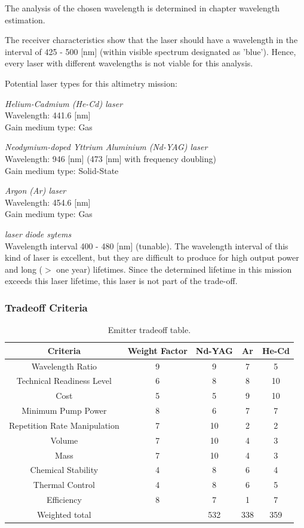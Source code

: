 The analysis of the chosen wavelength is determined in chapter wavelength estimation.

The receiver characteristics show that the laser should have a wavelength in the interval of 425 - 500 [nm] (within visible spectrum designated as 'blue'). Hence, every \acs{laser} with different wavelengths is not viable for this analysis.

Potential \acs{laser} types for this altimetry mission:

\textit{Helium-Cadmium (He-Cd) \acs{laser}}\\
Wavelength: 441.6 [nm]\\
Gain medium type: Gas

\textit{Neodymium-doped Yttrium Aluminium (Nd-YAG) \acs{laser}}\\
Wavelength: 946 [nm] (473 [nm] with frequency doubling)\\
Gain medium type: Solid-State

\textit{Argon (Ar) \acs{laser}}\\	
Wavelength: 454.6 [nm]\\
Gain medium type: Gas

\textit{\acs{laser} diode sytems}\\
Wavelength interval 400 - 480 [nm] (tunable). The wavelength interval of this kind of \acs{laser} is excellent, but they are difficult to produce for high output power and long ($>$ one year) lifetimes. Since the determined lifetime in this mission exceeds this \acs{laser} lifetime, this \acs{laser} is not part of the trade-off.
	
	\subsubsection{Tradeoff Criteria}

\begin{table}[h]
	\centering
		\begin{tabular}{c|c|c|c|c}
		 \textbf{Criteria} & \textbf{Weight Factor} & \textbf{Nd-YAG} & \textbf{Ar} & \textbf{He-Cd} \\ \hline \hline
		 Wavelength Ratio & 9 & 9 & 7 & 5 \\
		 Technical Readiness Level & 6 & 8 & 8 & 10 \\
		 Cost & 5 & 5 & 9 & 10 \\ 
		 Minimum Pump Power & 8 & 6 & 7 & 7 \\
		 Repetition Rate Manipulation & 7 & 10 & 2 & 2 \\ 
		 Volume & 7 & 10 & 4 & 3 \\ 
		 Mass & 7 & 10 & 4 & 3  \\
		 Chemical Stability & 4 & 8 & 6 & 4 \\
		 Thermal Control & 4 & 8 & 6 & 5 \\
		 Efficiency & 8 & 7 & 1 & 7 \\ \hline
		 Weighted total &   & 532 & 338 & 359
			
		\end{tabular}
	\caption{Emitter tradeoff table.}
	\label{table:emitterTradeTable}
\end{table}

